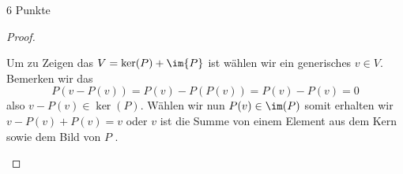 \documentclass{problemset}
\begin{document}
\begin{problem}[Projektionen]{6 Punkte}
\begin{proof}
\begin{enumerate}
              Um zu Zeigen das $V = \ker(P) + \im{P}$ ist wählen wir ein generisches $v \in
                  V$. Bemerken wir das \[
                  P(v - P(v)) = P(v) - P(P(v)) = P(v) - P(v) = 0
              \] also $v - P(v) \in \ker(P)$. Wählen wir nun $P(v) \in \im(P)$ somit erhalten
              wir $v - P(v) + P(v) = v$ oder $v$ ist die Summe von einem Element aus dem Kern
              sowie dem Bild von $P$ \checkmark.

    \end{enumerate}
\end{proof}
\end{problem}
\end{document}
